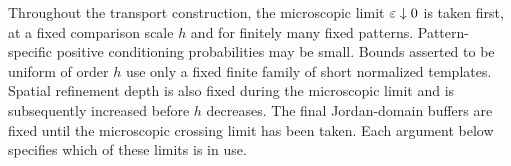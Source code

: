 Throughout the transport construction, the microscopic limit
$\varepsilon\downarrow0$ is taken first, at a fixed comparison scale $h$ and
for finitely many fixed patterns. Pattern-specific positive
conditioning probabilities may be small. Bounds asserted to be
uniform of order $h$ use only a fixed finite family of short normalized
templates. Spatial refinement depth is also fixed during the
microscopic limit and is subsequently increased before $h$ decreases.
The final Jordan-domain buffers are fixed until the microscopic
crossing limit has been taken. Each argument below specifies which of
these limits is in use.
